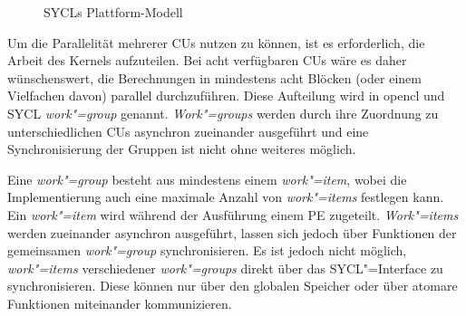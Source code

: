 \begin{figure}
    \caption{SYCLs Plattform-Modell \cite[nach][23]{opencl2012}}
    \label{sycl:konzepte:abstraktion:plattform}
\end{figure}

Um die Parallelität mehrerer CUs nutzen zu können, ist es erforderlich, die
Arbeit des Kernels aufzuteilen. Bei acht verfügbaren CUs wäre es daher
wünschenswert, die Berechnungen in mindestens acht Blöcken (oder einem
Vielfachen davon) parallel durchzuführen. Diese Aufteilung wird in \gls{opencl}
und SYCL \textit{work"=group} genannt. \textit{Work"=groups} werden durch ihre
Zuordnung zu unterschiedlichen CUs asynchron zueinander ausgeführt und eine
Synchronisierung der Gruppen ist nicht ohne weiteres möglich.

Eine \textit{work"=group} besteht aus mindestens einem \textit{work"=item},
wobei die Implementierung auch eine maximale Anzahl von \textit{work"=items}
festlegen kann. Ein \textit{work"=item} wird während der Ausführung einem PE
zugeteilt. \textit{Work"=items} werden zueinander asynchron ausgeführt, lassen
sich jedoch über Funktionen der gemeinsamen \textit{work"=group}
synchronisieren. Es ist jedoch nicht möglich, \textit{work"=items} verschiedener
\textit{work"=groups} direkt über das SYCL"=Interface zu synchronisieren. Diese
können nur über den globalen Speicher oder über atomare Funktionen miteinander
kommunizieren.

